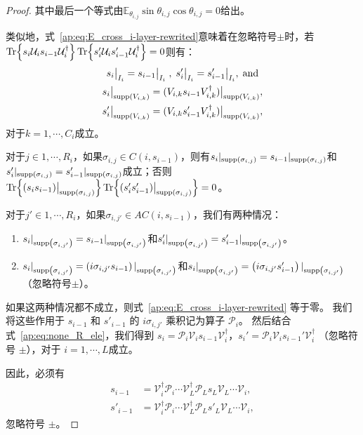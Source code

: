 \begin{lemma}
\begin{proof}
    其中最后一个等式由$\mathbb{E}_{\theta_{i,j}} \sin{\theta_{i,j}} \cos{\theta_{i,j}}=0$给出。

    类似地，式~\eqref{ap:eq:E_cross_i-layer-rewrited}意味着在忽略符号$\pm$时，若$\Tr{s_i\mathcal{U}_i s_{i-1}\mathcal{U}_i^\dagger}\Tr{s'_i\mathcal{U}_i s'_{i-1}\mathcal{U}_i^\dagger}=0$则有： 
    \begin{equation}\label{ap:eq:none_R_ele}
        \begin{gathered}
          s_i\big|_{I_i}=s_{i-1}\big|_{I_i} \;,\; s'_i\big|_{I_i}=s'_{i-1}\big|_{I_i}, \; \mathrm{and}\\
          s_i\big|_{{\text{supp} \left( V_{i,k} \right)}}=(V_{i,k} s_{i-1}V_{i,k}^\dagger)\big|_{{\text{supp} \left( V_{i,k} \right)}},\\
          s'_i\big|_{{\text{supp} \left( V_{i,k} \right)}}=(V_{i,k} s'_{i-1}V_{i,k}^\dagger)\big|_{{\text{supp} \left( V_{i,k} \right)}},
        \end{gathered}
    \end{equation}
    对于$k=1,\cdots,C_i$成立。%
    
    对于$j\in{1,\cdots,R_i}$，如果$\sigma_{i,j}\in C(i,s_{i-1})$，则有$s_{i}|_{{\text{supp} \left( \sigma_{i,j} \right)}}=s_{i-1}|_{{\text{supp} \left( \sigma_{i,j} \right)}}$和$s'_{i}|_{{\text{supp} \left( \sigma_{i,j} \right)}}=s'_{i-1}|_{{\text{supp} \left( \sigma_{i,j} \right)}}$成立；否则$\Tr{(s_i s_{i-1})\big|_{{\text{supp} \left( \sigma_{i,j} \right)}}}\Tr{(s'_i s'_{i-1})\big|_{{\text{supp} \left( \sigma_{i,j} \right)}}}=0$。 
    
    对于$j'\in{1,\cdots,R_i}$，如果$\sigma_{i,j'}\in AC(i,s_{i-1})$，我们有两种情况： 
    \begin{enumerate} 
        \item $s_{i}|_{{\text{supp} \left( \sigma_{i,j'} \right)}}=s_{i-1}|_{{\text{supp} \left( \sigma_{i,j'} \right)}}$和$s'_{i}|_{{\text{supp} \left( \sigma_{i,j'} \right)}}=s'_{i-1}|_{{\text{supp} \left( \sigma_{i,j'} \right)}}$。 
        \item $s_{i}|_{{\text{supp} \left( \sigma_{i,j'} \right)}}= \left(i\sigma_{i,j'} s_{i-1}\right)|_{{\text{supp} \left( \sigma_{i,j'} \right)}}$和$s_{i}|_{{\text{supp} \left( \sigma_{i,j'} \right)}}= \left(i\sigma_{i,j'} s'_{i-1}\right)|_{{\text{supp} \left( \sigma_{i,j'} \right)}}$（忽略符号$\pm$）。 
    \end{enumerate} 
    如果这两种情况都不成立，则式~\eqref{ap:eq:E_cross_i-layer-rewrited} 等于零。
    我们将这些作用于 $s_{i-1}$ 和 $s'_{i-1}$ 的 $i\sigma_{i,j'}$ 乘积记为算子 $\mathcal{P}_i$。
    然后结合 式~\eqref{ap:eq:none_R_ele}，我们得到 $s_i= \mathcal{P}_i \mathcal{V}_i s_{i-1} \mathcal{V}_i^\dagger$，$s_i'=\mathcal{P}_i \mathcal{V}_i s_{i-1}' \mathcal{V}_i^\dagger$ （忽略符号 $\pm$），对于 $i=1,\cdots ,L$成立。
    
    因此，必须有
    \begin{equation}
      \begin{aligned}
        s_{i-1}&=\mathcal{V}_{i}^\dagger \mathcal{P}_{i}\cdots \mathcal{V}_L^\dagger \mathcal{P}_L s_L \mathcal{V}_L\cdots\mathcal{V}_{i},\\
        s'_{i-1}&= \mathcal{V}_{i}^\dagger \mathcal{P}_{i}\cdots \mathcal{V}_L^\dagger \mathcal{P}_L s'_L \mathcal{V}_L\cdots\mathcal{V}_{i},
      \end{aligned}
    \end{equation}
    忽略符号 $\pm$。
    

\end{proof}
\end{lemma}
